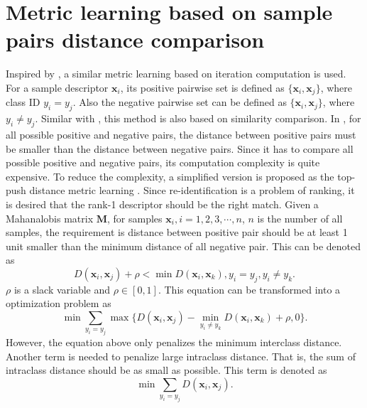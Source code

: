  \section{Metric learning based on sample pairs distance comparison}
 Inspired by \cite{TDL}, a similar metric learning based on iteration computation is used. For a  sample descriptor $\bm{x}_i$,  its positive pairwise set is defined as $\{\bm{x}_i,\bm{x}_j\}$, where class ID $y_i = y_j$. Also the negative pairwise set can be defined as $\{\bm{x}_i,\bm{x}_j\}$, where $y_i \ne y_j$. Similar with \cite{PRDC}, this method is also based on similarity comparison. In \cite{PRDC}, for all possible positive and negative pairs, the distance between positive pairs must be smaller than the distance between negative pairs. Since it has to compare all possible positive and negative pairs, its computation complexity is quite expensive. To reduce the complexity, a simplified version is proposed as the top-push distance metric learning \cite{TDL}.  Since re-identification is a problem of ranking, it is desired that the rank-1 descriptor should be the right match. Given a Mahanalobis matrix $\bm{M}$, for samples $\bm{x}_i, i = 1,2,3,\cdots,n$, $n$ is the number of all samples, the requirement is distance between positive pair should be at least 1 unit smaller than the minimum distance of all negative pair. This can be denoted as 
 \begin{equation}
 D(\bm{x}_i,\bm{x}_j) + \rho < \min D(\bm{x}_i,\bm{x}_k), y_i = y_j, y_i\ne y_k.
 \end{equation}
 $\rho$ is a slack variable and $\rho \in [0,1]$. This equation can be transformed into a optimization problem as
 \begin{equation}
 \label{term1}
 \min \sum_{y_i = y_j} \max \{D(\bm{x}_i,\bm{x}_j) -  \min_{ y_i\ne y_k} D(\bm{x}_i,\bm{x}_k)  + \rho , 0\}.
 \end{equation}
However, the equation above only penalizes the minimum interclass distance. Another term is needed to penalize large intraclass distance. That is, the sum of intraclass distance should be as small as possible. This term is denoted as 
 \begin{equation} \label{term2}
 \min \sum_{y_i = y_j} D(\bm{x}_i,\bm{x}_j).
 \end{equation}

